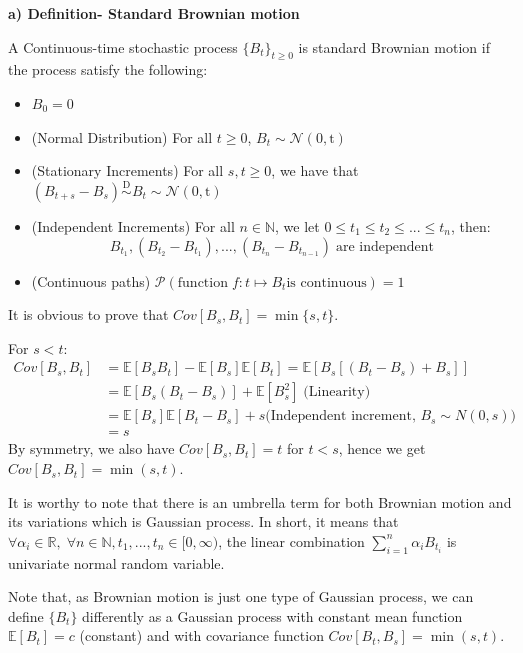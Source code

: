 \documentclass[12pt,a4paper,oneside]{book}
\begin{document}
	\textbf{a) Definition- Standard Brownian motion} 
	
	A Continuous-time stochastic process $\{B_t\}_{t\geq 0}$ is standard Brownian motion if the process satisfy the following:
	\begin{itemize}[label=$\bullet$]
		\item $B_0=0$
		\item (Normal Distribution)  For all $t\geq 0$, $B_t \sim \mathcal{N}(0,\text{t})$
		\item (Stationary Increments) For all $s,t \geq 0$, we have that $(B_{t+s}-B_s) \overset{\text{D}}{\sim} B_t \sim \mathcal{N}(0,\text{t})$
		\item (Independent Increments) For all $n\in \mathbb{N}$, we let 
		$0\leq t_1 \le t_2 \le ... \le t_n$, then:
		\[B_{t_1}, (B_{t_2}-B_{t_1}), ..., (B_{t_n}-B_{t_{n-1}}) \; \text{are independent}\]
		\item (Continuous paths)   $\mathcal{P}(\text{function} \; f:t \mapsto B_t \text{is continuous})= 1$
	\end{itemize} 

	It is obvious to prove that $Cov[B_s, B_t]= \min\{s,t\}$.
	
	For $s< t:$	
	\begin{equation*} 
		\begin{split}
	Cov[B_s, B_t] &= \mathbb{E}[B_sB_t]- \mathbb{E}[B_s]\mathbb{E}[B_t]= \mathbb{E}[B_s[(B_t-B_s)+ B_s]]\\
	&= \mathbb{E}[B_s(B_t-B_s)]+ \mathbb{E}[B_s^2] \; \text{(Linearity)}\\
	&= \mathbb{E}[B_s]\mathbb{E}[B_t-B_s] + s \text{(Independent increment, $B_s \sim N(0,s)$)}\\
	&= s
	\end{split}
	\end{equation*}
	By symmetry, we also have $Cov[B_s, B_t]=t$ for $t<s$, hence we get $Cov[B_s, B_t]= \min (s,t)$.
	
	It is worthy to note that there is an umbrella term for both Brownian motion and its variations which is Gaussian process. In short, it means that $\forall \alpha_i\in \mathbb{R},\; \forall n\in \mathbb{N}, t_1,...,t_n\in [0,\infty)$, the linear combination $\sum_{i=1}^{n}\alpha_iB_{t_i}$ is univariate normal random variable. 
	
	Note that, as Brownian motion is just one type of Gaussian process, we can define  $\{B_t\}$ differently as a Gaussian process with constant mean function $\mathbb{E}[B_t]= c$ (constant) and with covariance function $Cov[B_t, B_s]= \min (s,t)$.\\
\end{document}
